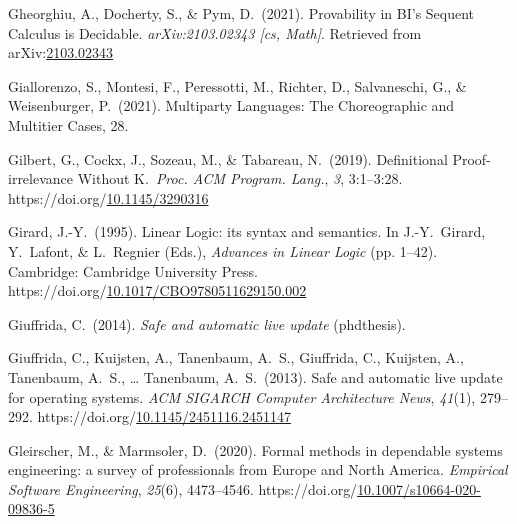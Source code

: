 \documentclass[12pt,twoside]{article}
\begin{document}
{\begin{thebibliography}{1079}
\mdbibitemlabel{}Gheorghiu, A., Docherty, S., \& Pym, D.~(2021). Provability in BI’s Sequent Calculus is Decidable. \emph{arXiv:2103.02343 {}[cs, Math]}. Retrieved from arXiv:\href{http://arxiv.org/abs/2103.02343}{2103.02343}%

\mdbibitemlabel{}Giallorenzo, S., Montesi, F., Peressotti, M., Richter, D., Salvaneschi, G., \& Weisenburger, P.~(2021). Multiparty Languages: The Choreographic and Multitier Cases, 28.%

\mdbibitemlabel{}Gilbert, G., Cockx, J., Sozeau, M., \& Tabareau, N.~(2019). Definitional Proof-irrelevance Without K.~\emph{Proc. ACM Program. Lang.}, \emph{3}, 3:1–3:28. https://doi.org/\href{https://dx.doi.org/10.1145/3290316}{10.1145/3290316}%

\mdbibitemlabel{}Girard, J.-Y.~(1995). Linear Logic: its syntax and semantics. In J.-Y.~Girard, Y.~Lafont, \& L.~Regnier (Eds.), \emph{Advances in Linear Logic} (pp. 1–42). Cambridge: Cambridge University Press. https://doi.org/\href{https://dx.doi.org/10.1017/CBO9780511629150.002}{10.1017/CBO9780511629150.002}%

\mdbibitemlabel{}Giuffrida, C.~(2014). \emph{Safe and automatic live update} (phdthesis).%

\mdbibitemlabel{}Giuffrida, C., Kuijsten, A., Tanenbaum, A.~S., Giuffrida, C., Kuijsten, A., Tanenbaum, A.~S., … Tanenbaum, A.~S.~(2013). Safe and automatic live update for operating systems. \emph{ACM SIGARCH Computer Architecture News}, \emph{41}(1), 279–292. https://doi.org/\href{https://dx.doi.org/10.1145/2451116.2451147}{10.1145/2451116.2451147}%

\mdbibitemlabel{}Gleirscher, M., \& Marmsoler, D.~(2020). Formal methods in dependable systems engineering: a survey of professionals from Europe and North America. \emph{Empirical Software Engineering}, \emph{25}(6), 4473–4546. https://doi.org/\href{https://dx.doi.org/10.1007/s10664-020-09836-5}{10.1007/s10664-020-09836-5}%


\end{thebibliography}}
\end{document}
